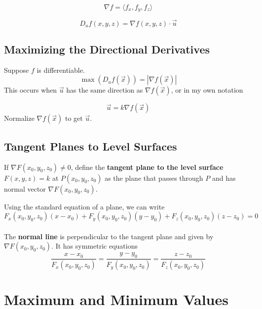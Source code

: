 \documentclass{report}  %
\begin{document}
\begin{equation}
	\nabla f= \langle f_x , f_y , f_z \rangle
\end{equation}

\begin{equation}
	D_u f(x, y, z) = \nabla f(x, y, z) \cdot \vec{u}
\end{equation}

\subsection*{Maximizing the Directional Derivatives}
Suppose $f$ is differentiable. 
\begin{equation}
	\max(D_u f(\vec{x})) = |\nabla f(\vec{x})|
\end{equation}
This occurs when $\vec{u}$ has the same direction as $\nabla f(\vec{x})$, or in my own notation

\begin{equation}
	\vec{u} = k \nabla f(\vec{x})
\end{equation}
Normalize $\nabla f(\vec{x})$ to get $\vec{u}$. 

\subsection*{Tangent Planes to Level Surfaces}
If $\nabla F(x_0, y_0, z_0) \ne 0$, define the \textbf{tangent plane to the level surface} $F(x, y, z) = k$ at $P(x_0, y_0, z_0)$ as the plane that passes through $P$ and has normal vector $\nabla F(x_0, y_0, z_0)$. 

Using the standard equation of a plane, we can write 
\begin{equation}
	F_x (x_0, y_0, z_0) (x-x_0) + 
	F_y (x_0, y_0, z_0) (y-y_0) + 
	F_z (x_0, y_0, z_0) (z-z_0) = 0
\end{equation} \\

The \textbf{normal line} is perpendicular to the tangent plane and given by 
$\nabla F(x_0, y_0, z_0)$. It has symmetric equations
\begin{equation}
	\frac{x-x_0}{F_x (x_0, y_0, z_0)} = 
	\frac{y-y_0}{F_y (x_0, y_0, z_0)} = 
	\frac{z-z_0}{F_z (x_0, y_0, z_0)}
\end{equation}

\newpage 

\section{Maximum and Minimum Values}
\end{document}
